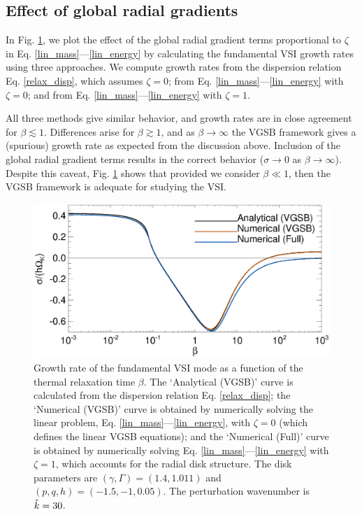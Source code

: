 \subsection{Effect of global radial gradients}
In  Fig. \ref{gcorr_compare}, we plot the effect of the global radial gradient terms
proportional to $\zeta$ in Eq. \ref{lin_mass}---\ref{lin_energy}
by calculating the
fundamental VSI growth rates using three approaches. We compute growth rates from the dispersion
relation Eq. \ref{relax_disp}, which assumes $\zeta=0$;  from
Eq. \ref{lin_mass}---\ref{lin_energy} with $\zeta=0$; and from
Eq. \ref{lin_mass}---\ref{lin_energy}  with $\zeta=1$.   

All three methods give similar behavior, and growth rates are in close
agreement for $\beta\lesssim 1$. Differences arise for 
$\beta\gtrsim1$, and as $\beta\to\infty$ the VGSB framework gives a
(spurious) growth rate as expected from the discussion
above. Inclusion of the global radial gradient terms results in the
correct behavior  ($\sigma\to0$ as $\beta\to\infty$). Despite this
caveat, Fig. \ref{gcorr_compare} shows that provided we consider
$\beta\ll1$, then the VGSB framework is adequate for studying the
VSI. 
  
\begin{figure}
  \includegraphics[width=\linewidth,clip=true,trim=0cm 0.0cm 0cm
  0cm]{figures/gcorr_compare} 
  \caption{Growth rate of the fundamental VSI mode as a function of
    the thermal relaxation time $\beta$. The `Analytical (VGSB)' curve
    is calculated from the dispersion relation Eq. \ref{relax_disp};
    the `Numerical (VGSB)' curve is obtained by numerically solving
    the linear problem, Eq. \ref{lin_mass}---\ref{lin_energy}, with $\zeta=0$
    (which defines the linear VGSB equations); and the `Numerical
    (Full)' curve is obtained by numerically solving 
    Eq. \ref{lin_mass}---\ref{lin_energy}  with $\zeta=1$, which
    accounts for the radial disk structure.  
    The disk parameters are $(\gamma, \Gamma)=(1.4, 1.011)$ and
    $(p,q,h)=(-1.5,-1,0.05)$. The perturbation
    wavenumber is $\hat{k}=30$. 
    \label{gcorr_compare}}  
\end{figure}










